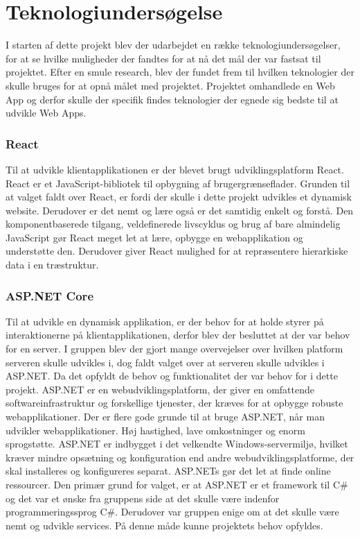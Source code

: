 \chapter{Teknologiundersøgelse}

I starten af dette projekt blev der udarbejdet en række teknologiundersøgelser, for at se hvilke muligheder der fandtes for at nå det mål der var fastsat til projektet. Efter en smule research, blev der fundet frem til hvilken teknologier der skulle bruges for at opnå målet med projektet. Projektet omhandlede en Web App og derfor skulle der specifik findes teknologier der egnede sig bedste til at udvikle Web Apps.     

\subsection{React}

Til at udvikle klientapplikationen er der blevet brugt udviklingsplatform React. React er et JavaScript-bibliotek til opbygning af brugergrænseflader. Grunden til at valget faldt over React, er fordi der skulle i dette projekt udvikles
et dynamisk website. Derudover er det nemt og lære også er det samtidig enkelt og forstå. Den komponentbaserede tilgang, veldefinerede livscyklus og brug af bare almindelig JavaScript gør React meget let at lære, opbygge en webapplikation og understøtte den. Derudover giver React mulighed for at repræsentere hierarkiske data i en træstruktur.

\subsection{ASP.NET Core}

Til at udvikle en dynamisk applikation, er der behov for at holde styrer på interaktionerne på klientapplikationen, derfor blev der besluttet at der var behov for en server. 
I gruppen blev der gjort mange overvejelser over hvilken platform serveren skulle udvikles i, dog faldt valget over at serveren skulle udvikles i ASP.NET. Da det opfyldt de behov og funktionalitet der var behov for i dette projekt. ASP.NET er en webudviklingsplatform, der giver en omfattende softwareinfrastruktur og forskellige tjenester, der kræves for at opbygge robuste webapplikationer. 
Der er flere gode grunde til at bruge ASP.NET, når man udvikler webapplikationer. Høj hastighed, lave omkostninger og enorm sprogstøtte. ASP.NET er indbygget i det velkendte Windows-servermiljø, hvilket kræver mindre opsætning og konfiguration end andre webudviklingsplatforme, der skal installeres og konfigureres separat. ASP.NETs gør det let at finde online ressourcer. 
Den primær grund for valget, er at ASP.NET er et framework til C\# og det var et ønske fra gruppens side at det skulle være indenfor programmeringssprog C\#. Derudover var gruppen enige om at det skulle være nemt og udvikle services. På denne måde kunne projektets behov opfyldes. 


